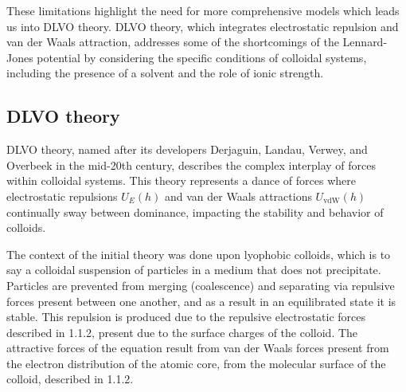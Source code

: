 




These limitations highlight the need for more comprehensive models which leads us into DLVO theory. DLVO theory, which integrates electrostatic repulsion and van der Waals attraction, addresses some of the shortcomings of the Lennard-Jones potential by considering the specific conditions of colloidal systems, including the presence of a solvent and the role of ionic strength.\cite{libretexts2020} %


\subsection{DLVO theory}



DLVO theory, named after its developers Derjaguin, Landau, Verwey, and Overbeek in the mid-20th century, describes the complex interplay of forces within colloidal systems. This theory represents a dance of forces where electrostatic repulsions \( U_E(h) \) and van der Waals attractions \( U_{\text{vdW}}(h) \) continually sway between dominance, impacting the stability and behavior of colloids.\cite{israelachvili2011intermolecular} \cite{Origin2V} \cite{DERJAGUINORIGIN}


The context of the initial theory was done upon lyophobic colloids, which is to say a colloidal suspension of particles in a medium that does not precipitate. Particles are prevented from merging (coalescence) and separating via repulsive forces present between one another, and as a result in an equilibrated state it is stable. This repulsion is produced due to the repulsive electrostatic forces described in 1.1.2, present due to the surface charges of the colloid. The attractive forces of the equation result from van der Waals forces present from the electron distribution of the atomic core, from the molecular surface of the colloid, described in 1.1.2.\cite{ninhama1999progress}

